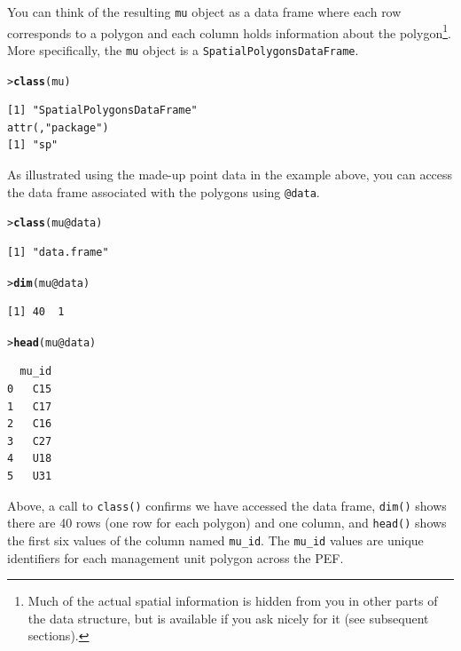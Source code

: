\documentclass[12pt,oneside]{book}\usepackage[]{graphicx}\usepackage[]{color}
\makeatletter
\newcommand{\hlopt}[1]{\textcolor[rgb]{0,0,0}{#1}}%
\newcommand{\hlstd}[1]{\textcolor[rgb]{0.345,0.345,0.345}{#1}}%
\newcommand{\hlkwc}[1]{\textcolor[rgb]{0.333,0.667,0.333}{#1}}%
\newcommand{\hlkwd}[1]{\textcolor[rgb]{0.737,0.353,0.396}{\textbf{#1}}}%
\newenvironment{kframe}{%
 \def\at@end@of@kframe{}%
 \ifinner\ifhmode%
  \def\at@end@of@kframe{\end{minipage}}%
  \begin{minipage}{\columnwidth}%
 \fi\fi%
 \def\FrameCommand##1{\hskip\@totalleftmargin \hskip-\fboxsep
 \colorbox{shadecolor}{##1}\hskip-\fboxsep
     \hskip-\linewidth \hskip-\@totalleftmargin \hskip\columnwidth}%
 \MakeFramed {\advance\hsize-\width
   \@totalleftmargin\z@ \linewidth\hsize
   \@setminipage}}%
 {\par\unskip\endMakeFramed%
 \at@end@of@kframe}
\newenvironment{knitrout}{}{} %
\makeatother
\begin{document}
You can think of the resulting \verb+mu+ object as a data frame where each row corresponds to a polygon and each column holds information about the polygon\footnote{Much of the actual spatial information is hidden from you in other parts of the data structure, but is available if you ask nicely for it (see subsequent sections).}.  More specifically, the \verb+mu+ object is a \verb+SpatialPolygonsDataFrame+.
\begin{knitrout}
\color{fgcolor}\begin{kframe}
\begin{alltt}
\hlstd{> }\hlkwd{class}\hlstd{(mu)}
\end{alltt}
\begin{verbatim}
[1] "SpatialPolygonsDataFrame"
attr(,"package")
[1] "sp"
\end{verbatim}
\end{kframe}
\end{knitrout}

As illustrated using the made-up point data in the example above, you can access the data frame associated with the polygons using \verb+@data+. 
\begin{knitrout}
\color{fgcolor}\begin{kframe}
\begin{alltt}
\hlstd{> }\hlkwd{class}\hlstd{(mu}\hlopt{@}\hlkwc{data}\hlstd{)}
\end{alltt}
\begin{verbatim}
[1] "data.frame"
\end{verbatim}
\begin{alltt}
\hlstd{> }\hlkwd{dim}\hlstd{(mu}\hlopt{@}\hlkwc{data}\hlstd{)}
\end{alltt}
\begin{verbatim}
[1] 40  1
\end{verbatim}
\begin{alltt}
\hlstd{> }\hlkwd{head}\hlstd{(mu}\hlopt{@}\hlkwc{data}\hlstd{)}
\end{alltt}
\begin{verbatim}
  mu_id
0   C15
1   C17
2   C16
3   C27
4   U18
5   U31
\end{verbatim}
\end{kframe}
\end{knitrout}

Above, a call to \verb+class()+ confirms we have accessed the data frame, \verb+dim()+ shows there are 40 rows (one row for each polygon) and one column, and \verb+head()+ shows the first six values of the column named \verb+mu_id+. The \verb+mu_id+ values are unique identifiers for each management unit polygon across the PEF.
\end{document}
